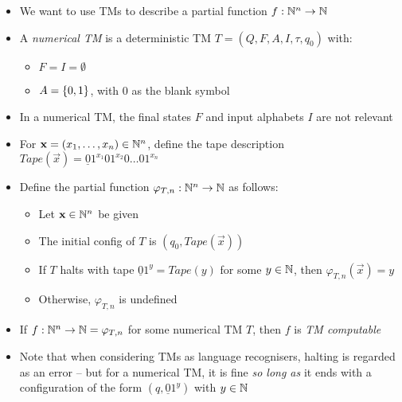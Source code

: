 \begin{itemize}
	
	\item We want to use TMs to describe a partial function $ f: \mathbb{N}^n \to \mathbb{N} $
	
	\item A \textit{numerical TM} is a deterministic TM $ T = (Q, F, A, I, \tau, q_0) $ with:
	
	\begin{itemize}
		
		\item $ F = I = \emptyset $
		
		\item $ A = \left\lbrace 0, 1 \right\rbrace $, with $ 0 $ as the blank symbol
		
	\end{itemize}

	\item In a numerical TM, the final states $ F $ and input alphabets $ I $ are not relevant
	
	\item For $ \mathbf{x} = (x_1, \dots, x_n) \in \mathbb{N}^n $, define the tape description $ Tape(\vec{x}) = \underline{0} 1^{x_1} 0 1^{x_2} 0 \dots 0 1^{x_n} $
	
	\item Define the partial function $ \varphi_{T, n}: \mathbb{N}^n \to \mathbb{N} $ as follows:
	
	\begin{itemize}
		
		\item Let $ \mathbf{x} \in \mathbb{N}^n $ be given
		
		\item The initial config of $ T $ is $ (q_0, Tape(\vec{x})) $
		
		\item If $ T $ halts with tape $ \underline{0} 1^{y} = Tape(y) $ for some $ y \in \mathbb{N} $, then $ \varphi_{T, n}(\vec{x}) = y $
		
		\item Otherwise, $ \varphi_{T, n} $ is undefined
		
	\end{itemize}

	\item If $ f: \mathbb{N}^n \to \mathbb{N} = \varphi_{T, n} $ for some numerical TM $ T $, then $ f $ is \textit{TM computable}  
	
	\item Note that when considering TMs as language recognisers, halting is regarded as an error -- but for a numerical TM, it is fine \textit{so long as} it ends with a configuration of the form $ (q, \underline{0}1^y) $ with $ y \in \mathbb{N} $
	

\end{itemize}
